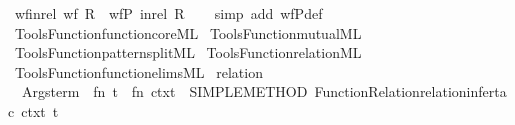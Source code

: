 \begin{isabellebody}
\isanewline
{}\isamarkupfalse%
\ wf{\isacharunderscore}{\kern0pt}in{\isacharunderscore}{\kern0pt}rel{\isacharcolon}{\kern0pt}\ {\isachardoublequoteopen}wf\ R\ {\isasymLongrightarrow}\ wfP\ {\isacharparenleft}{\kern0pt}in{\isacharunderscore}{\kern0pt}rel\ R{\isacharparenright}{\kern0pt}{\isachardoublequoteclose}\isanewline
%
\isadelimproof
\ \ %
\endisadelimproof
%
\isatagproof
{}\isamarkupfalse%
\ {\isacharparenleft}{\kern0pt}simp\ add{\isacharcolon}{\kern0pt}\ wfP{\isacharunderscore}{\kern0pt}def{\isacharparenright}{\kern0pt}%
\endisatagproof
{\isafoldproof}%
%
\isadelimproof
\isanewline
%
\endisadelimproof
%
\isadelimML
\isanewline
%
\endisadelimML
%
\isatagML
{}\isamarkupfalse%
\ {\isacartoucheopen}Tools{\isacharslash}{\kern0pt}Function{\isacharslash}{\kern0pt}function{\isacharunderscore}{\kern0pt}core{\isachardot}{\kern0pt}ML{\isacartoucheclose}\isanewline
{}\isamarkupfalse%
\ {\isacartoucheopen}Tools{\isacharslash}{\kern0pt}Function{\isacharslash}{\kern0pt}mutual{\isachardot}{\kern0pt}ML{\isacartoucheclose}\isanewline
{}\isamarkupfalse%
\ {\isacartoucheopen}Tools{\isacharslash}{\kern0pt}Function{\isacharslash}{\kern0pt}pattern{\isacharunderscore}{\kern0pt}split{\isachardot}{\kern0pt}ML{\isacartoucheclose}\isanewline
{}\isamarkupfalse%
\ {\isacartoucheopen}Tools{\isacharslash}{\kern0pt}Function{\isacharslash}{\kern0pt}relation{\isachardot}{\kern0pt}ML{\isacartoucheclose}\isanewline
{}\isamarkupfalse%
\ {\isacartoucheopen}Tools{\isacharslash}{\kern0pt}Function{\isacharslash}{\kern0pt}function{\isacharunderscore}{\kern0pt}elims{\isachardot}{\kern0pt}ML{\isacartoucheclose}\isanewline
\isanewline
{}\isamarkupfalse%
\ relation\ {\isacharequal}{\kern0pt}\ {\isacartoucheopen}\isanewline
\ \ Args{\isachardot}{\kern0pt}term\ {\isachargreater}{\kern0pt}{\isachargreater}{\kern0pt}\ {\isacharparenleft}{\kern0pt}fn\ t\ {\isacharequal}{\kern0pt}{\isachargreater}{\kern0pt}\ fn\ ctxt\ {\isacharequal}{\kern0pt}{\isachargreater}{\kern0pt}\ SIMPLE{\isacharunderscore}{\kern0pt}METHOD{\isacharprime}{\kern0pt}\ {\isacharparenleft}{\kern0pt}Function{\isacharunderscore}{\kern0pt}Relation{\isachardot}{\kern0pt}relation{\isacharunderscore}{\kern0pt}infer{\isacharunderscore}{\kern0pt}tac\ ctxt\ t{\isacharparenright}{\kern0pt}{\isacharparenright}{\kern0pt}\isanewline

\end{isabellebody}
